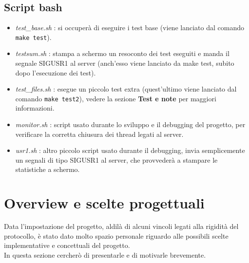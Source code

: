\subsection{Script bash}
\begin{flushleft}
\begin{itemize}
\item \emph{test\_base.sh} : si occuperà di eseguire i test base (viene lanciato  dal comando \texttt{make test}).

\item \emph{testsum.sh} : stampa a schermo un resoconto dei test eseguiti e manda il segnale SIGUSR1 al server (anch'esso viene lanciato da make test, subito dopo l'esecuzione dei test).

\item \emph{test\_files.sh} : esegue un piccolo test extra (quest'ultimo viene lanciato dal comando \texttt{make test2}), vedere la sezione \textbf{Test e note} per maggiori informazioni.

\item \emph{monitor.sh} : script usato durante lo sviluppo e il debugging del progetto, per verificare la corretta chiusura dei thread legati al server.

\item \emph{usr1.sh} : altro piccolo script usato durante il debugging, invia semplicemente un segnali di tipo SIGUSR1 al server, che provvederà a stampare le statistiche a schermo.

\end{itemize}
\end{flushleft}

\section{Overview e scelte progettuali}
\begin{flushleft}
Data l'impostazione del progetto, aldilà di alcuni vincoli legati alla rigidità del protocollo, è stato dato molto spazio personale riguardo alle possibili scelte implementative e concettuali del progetto.\\In questa sezione cercherò di presentarle e di motivarle brevemente.
\end{flushleft}


\vspace{1mm}



